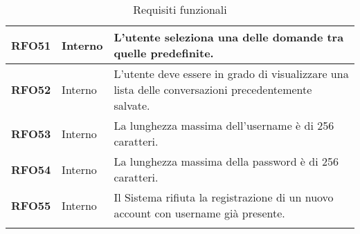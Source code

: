 \begin{longtable}{|>{\centering\arraybackslash}m{}|>{\centering\arraybackslash}m{}|>{\arraybackslash}m{}|}
	\hline
	\textbf{RFO51} & Interno 			& L'utente seleziona una delle domande tra quelle predefinite. \\
	\hline
	\textbf{RFO52} & Interno 			& L'utente deve essere in grado di visualizzare una lista delle conversazioni precedentemente salvate. \\
	\hline
	\textbf{RFO53} & Interno 			& La lunghezza massima dell'username è di 256 caratteri. \\
	\hline
	\textbf{RFO54} & Interno 			& La lunghezza massima della password è di 256 caratteri. \\
	\hline
	\textbf{RFO55} & Interno 			& Il Sistema rifiuta la registrazione di un nuovo account con username già presente. \\
	\hline
	\caption{Requisiti funzionali}
\end{longtable}

\pagebreak

